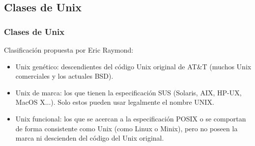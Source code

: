 \documentclass{beamer}
\begin{document}
\subsection{Clases de Unix}
\begin{frame}
\frametitle{Clases de Unix}

Clasificación propuesta por Eric Raymond:

\begin{itemize}
\item \alert{Unix genético}: descendientes del código Unix original de AT\&T (muchos Unix comerciales y los actuales BSD).
\item \alert{Unix de marca}: los que tienen la especificación SUS (Solaris, AIX, HP-UX, MacOS X...). Solo estos pueden usar \alert{legalmente} el nombre \textsc{UNIX\texttrademark}.
\item \alert{Unix funcional}: los que se acercan a la especificación POSIX o se comportan de forma consistente como Unix (como Linux o Minix), pero no poseen la marca ni descienden del código del Unix original.
\end{itemize}

\end{frame}






\end{document}
